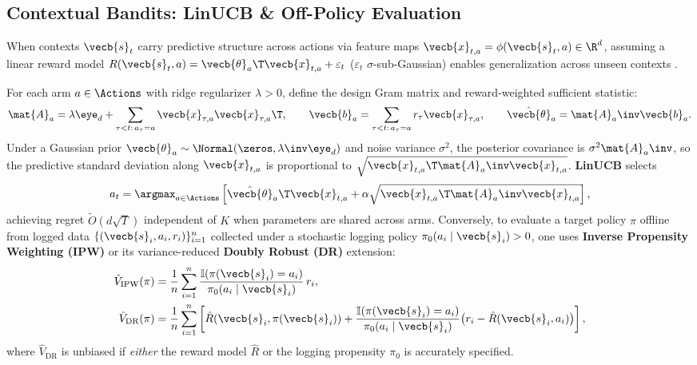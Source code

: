 \documentclass[../../../../master.tex]{subfiles}
\begin{document}
\subsection{Contextual Bandits: LinUCB \& Off-Policy Evaluation}

When contexts $\vecb{s}_t$ carry predictive structure across actions via feature maps $\vecb{x}_{t,a} = \phi(\vecb{s}_t, a) \in \R^d$, assuming a linear reward model $R(\vecb{s}_t, a) = \vecb{\theta}_a\T \vecb{x}_{t,a} + \varepsilon_t$ ($\varepsilon_t$ $\sigma$-sub-Gaussian) enables generalization across unseen contexts .

\begin{coremath}
For each arm $a \in \Actions$ with ridge regularizer $\lambda > 0$, define the design Gram matrix and reward-weighted sufficient statistic:
\begin{equation}
  \mat{A}_a = \lambda \eye_d + \sum_{\tau < t:\, a_\tau = a} \vecb{x}_{\tau,a}\vecb{x}_{\tau,a}\T,
  \qquad
  \vecb{b}_a = \sum_{\tau < t:\, a_\tau = a} r_\tau \vecb{x}_{\tau,a},
  \qquad
  \hat{\vecb{\theta}}_a = \mat{A}_a\inv \vecb{b}_a.
  \label{eq:bandit:linucb_ridge}
\end{equation}
Under a Gaussian prior $\vecb{\theta}_a \sim \Normal(\zeros, \lambda\inv \eye_d)$ and noise variance $\sigma^2$, the posterior covariance is $\sigma^2 \mat{A}_a\inv$, so the predictive standard deviation along $\vecb{x}_{t,a}$ is proportional to $\sqrt{\vecb{x}_{t,a}\T \mat{A}_a\inv \vecb{x}_{t,a}}$. \textbf{LinUCB} selects
\begin{equation}
  a_t = \argmax_{a \in \Actions} \left[ \hat{\vecb{\theta}}_a\T \vecb{x}_{t,a} + \alpha \sqrt{\vecb{x}_{t,a}\T \mat{A}_a\inv \vecb{x}_{t,a}} \right],
  \label{eq:bandit:linucb_action}
\end{equation}
achieving regret $\tilde{O}(d\sqrt{T})$ independent of $K$ when parameters are shared across arms. Conversely, to evaluate a target policy $\pi$ offline from logged data $\{(\vecb{s}_i, a_i, r_i)\}_{i=1}^n$ collected under a stochastic logging policy $\pi_0(a_i \mid \vecb{s}_i) > 0$, one uses \textbf{Inverse Propensity Weighting (IPW)} or its variance-reduced \textbf{Doubly Robust (DR)} extension:
\begin{equation}
\begin{aligned}
  \hat{V}_{\mathrm{IPW}}(\pi) &= \frac{1}{n}\sum_{i=1}^n \frac{\mathbb{I}(\pi(\vecb{s}_i) = a_i)}{\pi_0(a_i \mid \vecb{s}_i)}\, r_i, \\
  \hat{V}_{\mathrm{DR}}(\pi) &= \frac{1}{n}\sum_{i=1}^n \left[ \hat{R}(\vecb{s}_i, \pi(\vecb{s}_i)) + \frac{\mathbb{I}(\pi(\vecb{s}_i) = a_i)}{\pi_0(a_i \mid \vecb{s}_i)}\bigl(r_i - \hat{R}(\vecb{s}_i, a_i)\bigr) \right],
\end{aligned}
  \label{eq:bandit:ipw_dr}
\end{equation}
where $\hat{V}_{\mathrm{DR}}$ is unbiased if \emph{either} the reward model $\hat{R}$ or the logging propensity $\pi_0$ is accurately specified.
\end{coremath}
\end{document}
